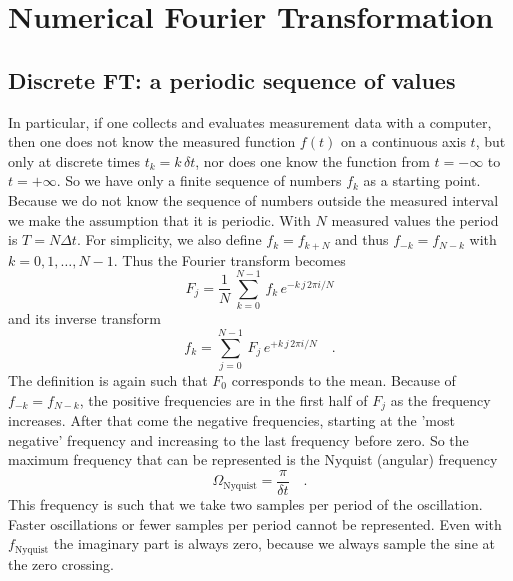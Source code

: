 \renewcommand{\lastmod}{September 18, 2023}
\renewcommand{\chapterauthors}{Markus Lippitz}

\chapter{Numerical Fourier Transformation}

\label{chap:appendix_FFT}


\section{Discrete FT: a periodic sequence of values}


In particular, if one collects and evaluates measurement data with a computer, then one does not know the measured function $f(t)$ on a continuous axis $t$, but only at discrete times $t_k = k \, \delta t$, nor does one know the function from $t = - \infty$ to $t = + \infty$. So we have only a finite sequence of numbers $f_k$ as a starting point.
Because we do not know the sequence of numbers outside the measured interval we make the assumption that it is periodic. With $N$ measured values the period is $T = N \Delta t$. For simplicity, we also define $f_k = f_{k + N}$ and thus $f_{-k} = f_{N - k}$ with $k= 0, 1, \dots, N-1$. Thus the Fourier transform becomes
\begin{equation}
  F_j =  \frac{1}{N} \, \sum_{k=0}^{N-1} \, f_k \, e^{- k \, j \, 2 \pi i / N } 
 \end{equation}
and its inverse transform
 \begin{equation}
 f_k =   \sum_{j=0}^{N-1} \, F_j \, e^{+ k \,  j \, 2 \pi i / N } \quad .
 \end{equation}
The definition is again such that $F_0$ corresponds to the mean. Because of $f_{-k} = f_{N - k}$, the positive frequencies are in the first half of $F_j$ as the frequency increases. After that come the negative frequencies, starting at the 'most negative' frequency and increasing to the last frequency before zero. So the maximum frequency that can be represented is the Nyquist (angular) frequency
\begin{equation}
\Omega_\text{Nyquist} = \frac{\pi}{\delta t} \quad .
\end{equation}
%
This frequency is such that we take two samples per period of the
oscillation. Faster oscillations or fewer samples per period cannot be
represented. Even with $f_\text{Nyquist}$ the imaginary part is always zero, because we always sample the sine at the 
zero crossing.


